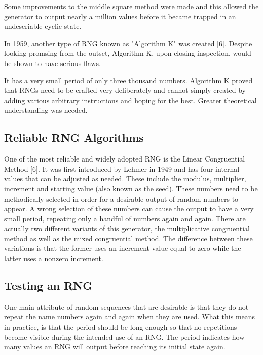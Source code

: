 \documentclass{article}
\begin{document}
    Some improvements to the middle square method were made and this allowed
    the generator to output nearly a million values before it became trapped
    in an undeseriable cyclic state.

    In 1959, another type of RNG known as "Algorithm K" was created [6].
    Despite looking promsing from the outset, Algorithm K, upon closing inspection,
    would be shown to have serious flaws.

    It has a very small period of only three thousand numbers.
    Algorithm K proved that RNGs need to be crafted very deliberately and cannot simply
    created by adding various arbitrary instructions and hoping for the best.
    Greater theoretical understanding was needed.
        
    \subsection{Reliable RNG Algorithms}

    One of the most reliable and widely adopted RNG is the Linear Congruential Method [6].
    It was first introduced by Lehmer in 1949 and has four internal values
    that can be adjusted as needed. These include the modulus, multiplier, increment
    and starting value (also known as the seed). These numbers need
    to be methodically selected in order for a desirable output of random numbers to appear.
    A wrong selection of these numbers can cause the output to have a very small period,
    repeating only a handful of numbers again and again.
    There are actually two different variants of this generator, the multiplicative congruential
    method as well as the mixed congruential method. The difference
    between these variations is that the former uses an increment value equal to zero while
    the latter uses a nonzero increment.

    \subsection{Testing an RNG}

    One main attribute of random sequences that are desirable is that they do
    not repeat the name numbers again and again when they are used.
    What this means in practice, is that the period should be long enough so
    that no repetitions become visible during the intended use of an RNG.
    The period indicates how many values an RNG will output before reaching its
    initial state again.
\end{document}

